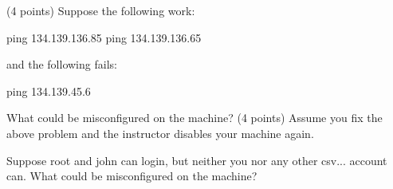 \ques
(4 points)
Suppose the following work:

{\program
 ping 134.139.136.85
 ping 134.139.136.65
\endprogram}

and the following fails:

{\program
 ping 134.139.45.6
\endprogram}

What could be misconfigured on the machine?
\vskip 1.0in
\ques
(4 points)
Assume you fix the above problem and the instructor disables your machine
again.

Suppose root and {\ltt{}john} can login, but neither you
nor any other {\ltt{}csv...} account can.
What could be misconfigured on the machine?
\bye
